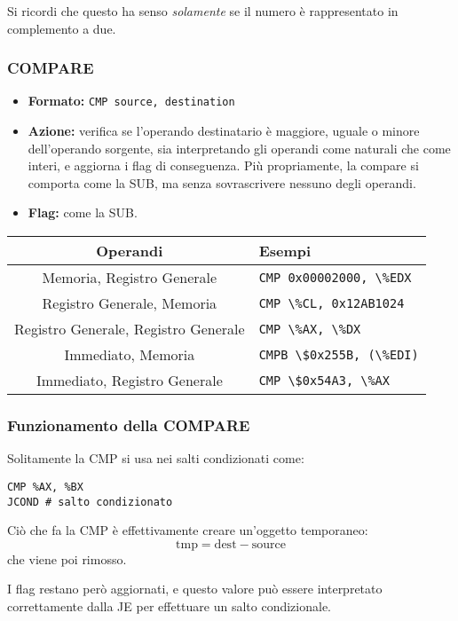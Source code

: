 \documentclass[a4paper,11pt]{article}
\begin{document}
Si ricordi che questo ha senso \textit{solamente} se il numero è rappresentato in complemento a due.

\subsubsection{COMPARE}
\begin{itemize}
	\item \textbf{Formato:} \lstinline|CMP source, destination|
	\item \textbf{Azione:} verifica se l'operando destinatario è maggiore, uguale o minore dell'operando sorgente, sia interpretando gli operandi come naturali che come interi, e aggiorna i flag di conseguenza.
		Più propriamente, la compare si comporta come la SUB, ma senza sovrascrivere nessuno degli operandi.
	\item \textbf{Flag:} come la SUB. 
\end{itemize}


		\begin{table}[H]
		\center {}
			\begin{tabular} { c | p{5cm} }
				\bfseries Operandi & \bfseries Esempi \\
				\hline
				Memoria, Registro Generale & \lstinline|CMP 0x00002000, \%EDX| \\ 
				Registro Generale, Memoria & \lstinline|CMP \%CL, 0x12AB1024| \\ 
				Registro Generale, Registro Generale & \lstinline|CMP \%AX, \%DX| \\ 
				Immediato, Memoria & \lstinline|CMPB \$0x255B, (\%EDI)| \\ 
				Immediato, Registro Generale & \lstinline|CMP \$0x54A3, \%AX|
			\end{tabular}
		\end{table}

\subsubsection{Funzionamento della COMPARE}
Solitamente la CMP si usa nei salti condizionati come:
\begin{lstlisting}[language=assembler,style=codestyle]	
CMP %AX, %BX
JCOND # salto condizionato
\end{lstlisting}
\noindent
Ciò che fa la CMP è effettivamente creare un'oggetto temporaneo:
$$
\text{tmp} = \text{dest} - \text{source}
$$
che viene poi rimosso.

I flag restano però aggiornati, e questo valore può essere interpretato correttamente dalla JE per effettuare un salto condizionale.
\end{document}
